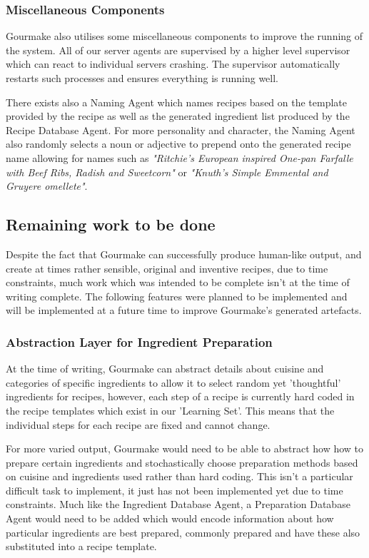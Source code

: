 \documentclass[9pt,titlepage,a4paper]{extarticle}
\begin{document}
\subsubsection{Miscellaneous Components}
    Gourmake also utilises some miscellaneous components to improve the running of the system. All of our server agents
    are supervised by a higher level supervisor which can react to individual servers crashing. The supervisor automatically
    restarts such processes and ensures everything is running well.

    There exists also a Naming Agent which names recipes based on the template provided by the recipe as well as the
    generated ingredient list produced by the Recipe Database Agent. For more personality and character, the
    Naming Agent also randomly selects a noun or adjective to prepend onto the generated recipe name allowing for
    names such as \textit{"Ritchie's European inspired One-pan Farfalle with Beef Ribs, Radish and Sweetcorn"} or
    \textit{"Knuth's Simple Emmental and Gruyere omellete"}.

\subsection{Remaining work to be done}
    Despite the fact that Gourmake can successfully produce human-like output, and create at times rather sensible,
    original and inventive recipes, due to time constraints, much work which was intended to be complete isn't at
    the time of writing complete. The following features were planned to be implemented and will be implemented
    at a future time to improve Gourmake's generated artefacts.

\subsubsection{Abstraction Layer for Ingredient Preparation}
    At the time of writing, Gourmake can abstract details about cuisine and categories of specific ingredients to allow
    it to select random yet 'thoughtful' ingredients for recipes, however, each step of a recipe is currently hard
    coded in the recipe templates which exist in our 'Learning Set'. This means that the individual steps for each
    recipe are fixed and cannot change.

    For more varied output, Gourmake would need to be able to abstract how how to prepare certain ingredients and
    stochastically choose preparation methods based on cuisine and ingredients used rather than hard coding. This isn't
    a particular difficult task to implement, it just has not been implemented yet due to time constraints. Much like
    the Ingredient Database Agent, a Preparation Database Agent would need to be added which would encode information
    about how particular ingredients are best prepared, commonly prepared and have these also substituted into
    a recipe template.
\end{document}
